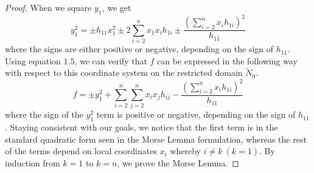 \documentclass[]{article}
\begin{document}
\begin{proof}
     When we square $y_1$, we get
     \begin{equation}
        y_1^2=\pm h_{11}x_1^2\pm2\sum_{i=2}^{n}{x_1x_ih_{1i}}\pm\frac{\left(\sum_{i=2}^{n}{x_ih_{1i}}\right)^2}{h_{11}}\tag{1.9}
     \end{equation}
     where the signs are either positive or negative, depending on the sign of $h_{11}$. Using equation
     $1.5$, we can verify that $f$ can be expressed in the following way with respect to this
     coordinate system on the restricted domain $\tilde{N}_0$.
     \begin{equation}
        f=\pm y_1^2 + \sum_{i=2}^{n}\sum_{j=2}^{n}{x_ix_jh_{ij}}-\frac{\left(\sum_{i=2}^{n}{x_ih_{1i}}\right)^2}{h_{11}}\tag{1.10}
     \end{equation}
     where the sign of the $y_1^2$ term is positive or negative, depending on the sign of $h_{11}$. Staying
     consistent with our goals, we notice that the first term is in the standard quadratic form seen
     in the Morse Lemma formulation, whereas the rest of the terms depend on local coordinates
     $x_i$ whereby $i\not=k \ (k=1)$. By induction from $k=1$ to $k=n$, we prove the Morse Lemma.
\end{proof}
\end{document}
